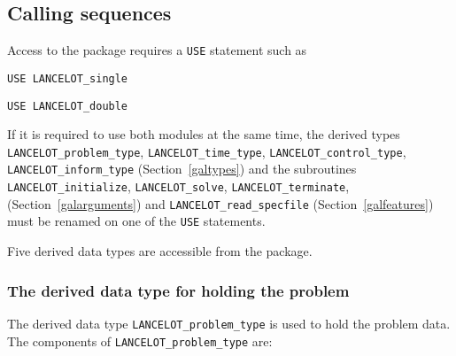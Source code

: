 \documentclass{galahad}
\newcommand{\fullpackagename}{LANC\-E\-LOT}
\begin{document}

\galhowto

\subsection{Calling sequences}

Access to the package requires a {\tt USE} statement such as

\medskip{}

\hskip0.5in {\tt USE \fullpackagename\_single}

\medskip{}

\hskip0.5in {\tt USE  \fullpackagename\_double}

\medskip

\noindent
If it is required to use both modules at the same time, the derived types
{\tt \fullpackagename\_problem\_type},
{\tt \fullpackagename\_\-time\_type},
{\tt \fullpackagename\_control\_type},
{\tt \fullpackagename\_inform\_type}
(Section~\ref{galtypes})
and the subroutines
{\tt \fullpackagename\_init\-ialize},
{\tt \fullpackagename\_\-solve},
{\tt \fullpackagename\_terminate},
(Section~\ref{galarguments})
and
{\tt \fullpackagename\_read\_specfile}
(Section~\ref{galfeatures})
must be renamed on one of the {\tt USE} statements.


\galtypes
Five derived data types are accessible from the package.


\subsubsection{The derived data type for holding the problem}\label{typeprob}
The derived data type {\tt \fullpackagename\_problem\_type} is used to hold
the problem data. The components of
{\tt \fullpackagename\_problem\_type}
are:
\end{document}

